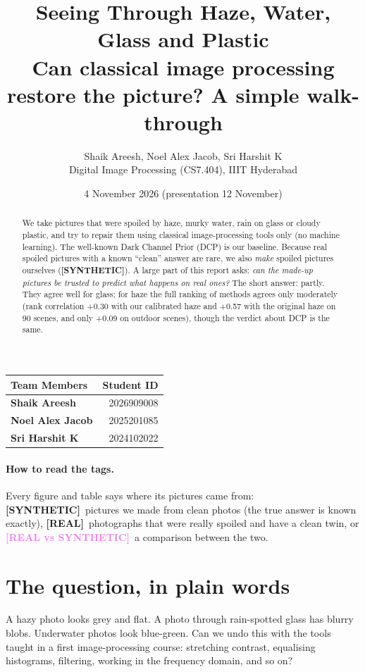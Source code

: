 \documentclass[10pt,a4paper]{article}
\title{Seeing Through Haze, Water, Glass and Plastic\\\large Can classical image processing restore the picture? A simple walk-through}
\author{Shaik Areesh, Noel Alex Jacob, Sri Harshit K\\ Digital Image Processing (CS7.404), IIIT Hyderabad}
\date{4 November 2026 (presentation 12 November)}
\newcommand{\SYN}{\textcolor{orange!85!black}{\textbf{[SYNTHETIC]}}}
\newcommand{\REAL}{\textcolor{teal!80!black}{\textbf{[REAL]}}}
\newcommand{\BOTH}{\textcolor{violet}{\textbf{[REAL vs SYNTHETIC]}}}
\begin{document}
\maketitle
\begin{center}\begin{tabular}{lr}\toprule
\textbf{Team Members} & Student ID\\\midrule
\textbf{Shaik Areesh} & 2026909008\\
\textbf{Noel Alex Jacob} & 2025201085\\
\textbf{Sri Harshit K} & 2024102022\\\bottomrule
\end{tabular}\end{center}

\begin{abstract}\noindent
We take pictures that were spoiled by haze, murky water, rain on glass or cloudy plastic, and try to repair them using classical image-processing tools only (no machine learning). The well-known Dark Channel Prior (DCP) is our baseline. Because real spoiled pictures with a known ``clean'' answer are rare, we also \emph{make} spoiled pictures ourselves (\SYN). A large part of this report asks: \emph{can the made-up pictures be trusted to predict what happens on real ones?} The short answer: partly. They agree well for glass; for haze the full ranking of methods agrees only moderately (rank correlation +0.30 with our calibrated haze and +0.57 with the original haze on 90 scenes, and only +0.09 on outdoor scenes), though the verdict about DCP is the same.
\end{abstract}

\paragraph{How to read the tags.} Every figure and table says where its pictures came from: \SYN\ pictures we made from clean photos (the true answer is known exactly), \REAL\ photographs that were really spoiled and have a clean twin, or \BOTH\ a comparison between the two.

\tableofcontents

\section{The question, in plain words}
A hazy photo looks grey and flat. A photo through rain-spotted glass has blurry blobs. Underwater photos look blue-green. Can we undo this with the tools taught in a first image-processing course: stretching contrast, equalising histograms, filtering, working in the frequency domain, and so on?
\end{document}

